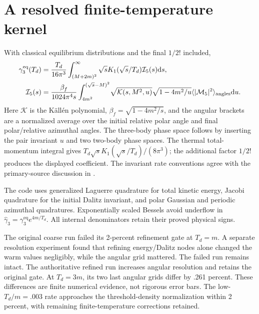 \documentclass[11pt]{article}
\newcommand{\dd}{\mathrm d}
\newcommand{\eq}{\mathrm{eq}}
\begin{document}
\section{A resolved finite-temperature kernel}
With classical equilibrium distributions and the final $1/2!$ included,
\begin{align}
 \gamma_3^\eq(T_d)&=\frac{T_d}{16\pi^3}
 \int_{(M+2m)^2}^\infty\sqrt{s}K_1(\sqrt{s}/T_d)\mathcal I_5(s)\dd s,\\
 \mathcal I_5(s)&=\frac{\beta_f}{1024\pi^4s}
 \int_{4m^2}^{(\sqrt{s}-M)^2}\!
 \sqrt{\mathcal K(s,M^2,u)}\sqrt{1-4m^2/u}
 \langle|\mathcal M_5|^2\rangle_{\rm angles}\dd u.
\end{align}
Here $\mathcal K$ is the K\"all\'en polynomial, $\beta_f=\sqrt{1-4m^2/s}$,
and the angular brackets are a normalized average over the initial relative
polar angle and final polar/relative azimuthal angles. The three-body phase
space follows by inserting the pair invariant $u$ and two two-body phase
spaces. The thermal total-momentum integral gives
$T_d\sqrt{s}K_1(\sqrt{s}/T_d)/(8\pi^3)$; the additional factor $1/2!$
produces the displayed coefficient. The invariant rate conventions agree
with the primary-source discussion in \cite{SAthermal}.

The code uses generalized Laguerre quadrature for total kinetic energy,
Jacobi quadrature for the initial Dalitz invariant, and polar Gaussian and
periodic azimuthal quadratures. Exponentially scaled Bessels avoid
underflow in $\widehat\gamma_3=\gamma_3^\eq e^{4m/T_d}$.
All internal denominators retain their proved physical signs.

The original coarse run failed its 2-percent refinement gate at $T_d=m$.
A separate resolution experiment found that refining energy/Dalitz nodes
alone changed the warm values negligibly, while the angular grid mattered.
The failed run remains intact. The authoritative refined run increases
angular resolution and retains the original gate. At $T_d=3m$, its two
last angular grids differ by .261 percent. These differences are finite
numerical evidence, not rigorous error bars. The low-$T_d/m=.003$ rate
approaches the threshold-density normalization within 2 percent, with
remaining finite-temperature corrections retained.
\end{document}
